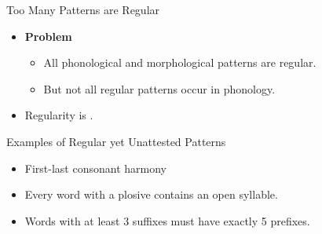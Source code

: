 \documentclass[xcolor={usenames,svgnames,x11names,table}]{beamer}
\begin{document}
\begin{frame}{Too Many Patterns are Regular}
    \begin{itemize}
        \item \textbf{Problem}
            \begin{itemize}
                \item All phonological and morphological patterns are regular.
                \item But not all regular patterns occur in phonology.
            \end{itemize}
        \item Regularity is .
    \end{itemize}
    \pause
    \begin{exampleblock}{Examples of Regular yet Unattested Patterns}
        \begin{itemize}
            \item First-last consonant harmony
            \item Every word with a plosive contains an open syllable.
            \item Words with at least 3 suffixes must have exactly 5 prefixes.
        \end{itemize}
    \end{exampleblock}
\end{frame}
\end{document}
